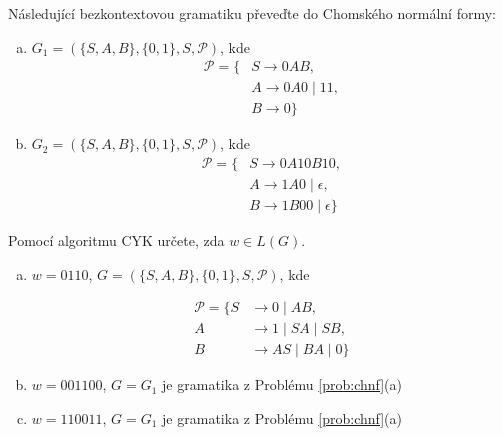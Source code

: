 \documentclass[a4paper,12pt]{amsart}
\begin{document}
    
\medskip\begin{problem}

    \label{prob:chnf}
    Následující bezkontextovou gramatiku převeďte do Chomského normální formy:

    \begin{multicols}{2}
        \begin{enumerate}[(a)]    
            \item $G_1=(\{S,A,B\},\{0,1\},S,\mathcal P)$, kde
            \begin{align*}
                \mathcal P=\{&S\rightarrow 0AB, \\
                &A\rightarrow 0A0\mid 11,\\
                &B\rightarrow 0\}
            \end{align*}
    
            \item $G_2=(\{S,A,B\},\{0,1\},S,\mathcal P)$, kde
            \begin{align*}            
                \mathcal P=\{
                &S\rightarrow 0A10B10, \\
                &A\rightarrow 1A0\mid \epsilon,\\
                &B\rightarrow 1B00\mid \epsilon\}
            \end{align*}

        \end{enumerate}
    \end{multicols}
        
\end{problem}
    

\medskip\begin{problem}
    
    Pomocí algoritmu CYK určete, zda $w\in L(G)$.

    \begin{enumerate}[(a)]\setlength{\itemsep}{6pt}
        
        \item $w=0110$, $G=(\{S,A,B\},\{0, 1\},S,\mathcal P)$, kde      
        
        \begin{align*}
            \mathcal P=\{S&\rightarrow 0\mid AB, \\
            A&\rightarrow 1\mid SA\mid SB, \\
            B&\rightarrow AS \mid BA \mid 0\}
        \end{align*}

        \item $w=001100$, $G=G_1$ je gramatika z Problému \ref{prob:chnf}(a)
        
        \item $w=110011$, $G=G_1$ je gramatika z Problému \ref{prob:chnf}(a)
        
    \end{enumerate}

\end{problem}
\end{document}
